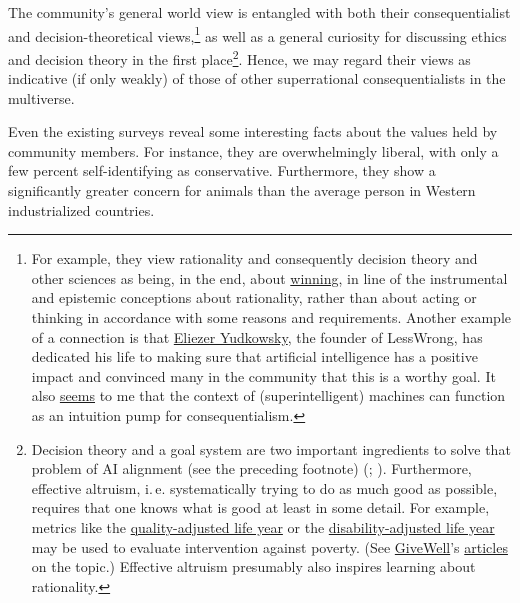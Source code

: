 The community's general world view is entangled with both their
consequentialist and decision-theoretical views,\footnote{For example,
  they view rationality and consequently decision theory and other
  sciences as being, in the end, about
  \href{http://lesswrong.com/lw/7i/rationality_is_systematized_winning/}{winning},
  in line of the instrumental and epistemic conceptions about
  rationality, rather than about acting or thinking in accordance with
  some reasons and requirements. Another example of a connection is that
  \href{https://en.wikipedia.org/wiki/Eliezer_Yudkowsky}{Eliezer
  Yudkowsky}, the founder of LessWrong, has dedicated his life to
  making sure that artificial intelligence has a positive impact and
  convinced many in the community that this is a worthy goal. It also
  \href{http://reducing-suffering.org/machine-ethics-and-preference-utilitarianism/\#Ethical_considerations}{seems}
  to me that the context of (superintelligent) machines can function as
  an intuition pump for consequentialism.} as well as a general
curiosity for discussing ethics and decision theory in the first
place\footnote{Decision theory and a goal system are two important
  ingredients to solve that problem of AI alignment (see the preceding
  footnote) (\cite{Soares2015-is}; \cite[chapter 13, section ``Component list'']{Bostrom2014-pc}).
  Furthermore, effective altruism, i.\,e. systematically trying to do as
  much good as possible, requires that one knows what is good at least
  in some detail. For example, metrics like the
  \href{https://en.wikipedia.org/wiki/Quality-adjusted_life_year}{quality-adjusted
  life year} or the
  \href{https://en.wikipedia.org/wiki/Disability-adjusted_life_year}{disability-adjusted
  life year} may be used to evaluate intervention against poverty. (See
  \href{http://www.givewell.org/}{GiveWell}'s
  \href{http://blog.givewell.org/2008/08/07/disability-adjusted-life-years-introduction/}{articles}
  on the topic.) Effective altruism presumably also inspires learning
  about rationality.}. Hence, we may regard their views as indicative
(if only weakly) of those of other superrational consequentialists in
the multiverse.

Even the existing surveys reveal some interesting facts about the values held by community
members. For instance, they are overwhelmingly liberal, with only a few percent self-identifying
as conservative. Furthermore, they show a significantly greater concern for animals than the
average person in Western industrialized countries. 

